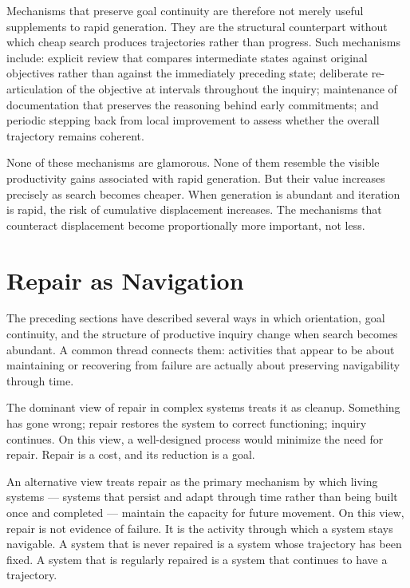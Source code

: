 Mechanisms that preserve goal continuity are therefore not merely useful
supplements to rapid generation. They are the structural counterpart without
which cheap search produces trajectories rather than progress. Such mechanisms
include: explicit review that compares intermediate states against original
objectives rather than against the immediately preceding state; deliberate
re-articulation of the objective at intervals throughout the inquiry; maintenance
of documentation that preserves the reasoning behind early commitments; and
periodic stepping back from local improvement to assess whether the overall
trajectory remains coherent.

None of these mechanisms are glamorous. None of them resemble the visible
productivity gains associated with rapid generation. But their value increases
precisely as search becomes cheaper. When generation is abundant and iteration
is rapid, the risk of cumulative displacement increases. The mechanisms that
counteract displacement become proportionally more important, not less.

\section{Repair as Navigation}

The preceding sections have described several ways in which orientation, goal
continuity, and the structure of productive inquiry change when search becomes
abundant. A common thread connects them: activities that appear to be about
maintaining or recovering from failure are actually about preserving navigability
through time.

The dominant view of repair in complex systems treats it as cleanup. Something
has gone wrong; repair restores the system to correct functioning; inquiry
continues. On this view, a well-designed process would minimize the need for
repair. Repair is a cost, and its reduction is a goal.

An alternative view treats repair as the primary mechanism by which living
systems --- systems that persist and adapt through time rather than being
built once and completed --- maintain the capacity for future movement. On
this view, repair is not evidence of failure. It is the activity through which
a system stays navigable. A system that is never repaired is a system whose
trajectory has been fixed. A system that is regularly repaired is a system
that continues to have a trajectory.

